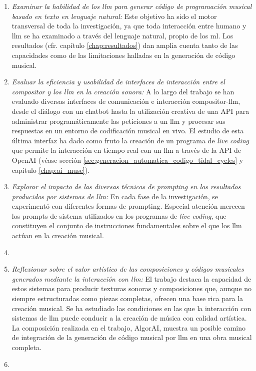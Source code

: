 \begin{enumerate}[label=\alph*)]
    \item \textit{Examinar la habilidad de los \gls{llm} para generar código de programación musical basado en texto en lenguaje natural:} Este objetivo ha sido el motor transversal de toda la investigación, ya que toda interacción entre humano y \gls{llm} se ha examinado a través del lenguaje natural, propio de los \gls{ml}. Los resultados (cfr. capítulo \ref{chap:resultados}) dan amplia cuenta tanto de las capacidades como de las limitaciones halladas en la generación de código musical.
    

    \item \textit{Evaluar la eficiencia y usabilidad de interfaces de interacción entre el compositor y los \gls{llm} en la creación sonora:} A lo largo del trabajo se han evaluado diversas interfaces de comunicación e interacción compositor-\gls{llm}, desde el diálogo con un chatbot hasta la utilización creativa de una API para administrar programáticamente las peticiones a un \gls{llm} y procesar sus respuestas en un entorno de codificación musical en vivo. El estudio de esta última interfaz ha dado como fruto la creación de un programa de \emph{live coding} que permite la interacción en tiempo real con un \gls{llm} a través de la API de OpenAI (véase sección \ref{sec:generacion_automatica_codigo_tidal_cycles} y capítulo \ref{chap:ai_muse}).
    

    \item \textit{Explorar el impacto de las diversas técnicas de \emph{prompting} en los resultados producidos por sistemas de \gls{llm}:} En cada fase de la investigación, se experimentó con diferentes formas de prompting. Especial atención merecen los prompts de sistema utilizados en los programas de \emph{live coding}, que constituyen el conjunto de instrucciones fundamentales sobre el que los \gls{llm} actúan en la creación musical.
    \item 
    
    
    \item \textit{Reflexionar sobre el valor artístico de las composiciones y códigos musicales generados mediante la interacción con \gls{llm}:}  El trabajo destaca la capacidad de estos sistemas para producir texturas sonoras y composiciones que, aunque no siempre estructuradas como piezas completas, ofrecen una base rica para la creación musical. Se ha estudiado las condiciones en las que la interacción con sistemas de \gls{llm} puede conducir a la creación de música con calidad artística. La composición realizada en el trabajo, AlgorAI, muestra un posible camino de integración de la generación de código musical por \gls{llm} en una obra musical completa.
    \item 
    

\end{enumerate}
